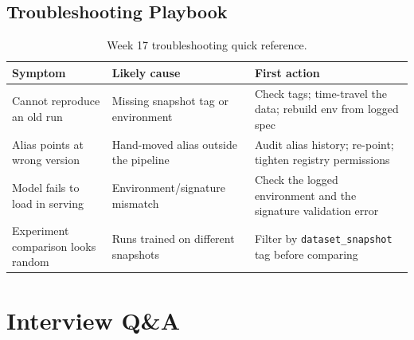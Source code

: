 \subsection{Troubleshooting Playbook}
\begin{table}[H]
\centering
\small
\begin{tabular}{@{}p{3.6cm}p{4.2cm}p{4.8cm}@{}}
\toprule
\textbf{Symptom} & \textbf{Likely cause} & \textbf{First action} \\
\midrule
Cannot reproduce an old run & Missing snapshot tag or environment & Check tags; time-travel the data; rebuild env from logged spec \\
Alias points at wrong version & Hand-moved alias outside the pipeline & Audit alias history; re-point; tighten registry permissions \\
Model fails to load in serving & Environment/signature mismatch & Check the logged environment and the signature validation error \\
Experiment comparison looks random & Runs trained on different snapshots & Filter by \texttt{dataset\_snapshot} tag before comparing \\
\bottomrule
\end{tabular}
\caption{Week 17 troubleshooting quick reference.}
\label{tab:ch17-trouble}
\end{table}

\section{Interview Q\&A}
